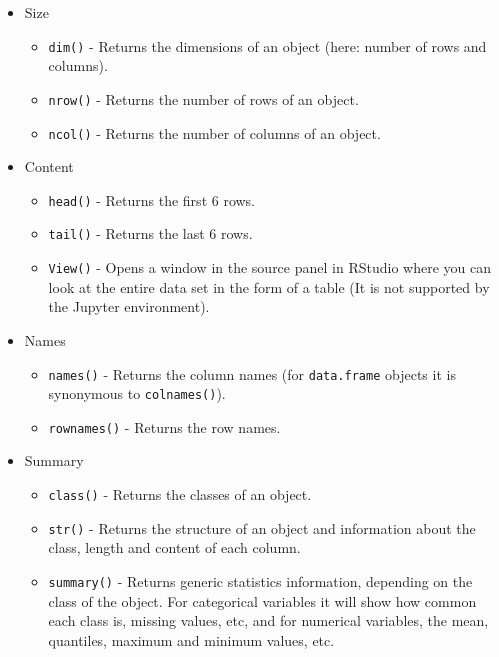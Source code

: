 \documentclass[
]{book}
\providecommand{\tightlist}{%
  \setlength{\itemsep}{0pt}\setlength{\parskip}{0pt}}
\begin{document}
\begin{itemize}
\tightlist
\item
  Size

  \begin{itemize}
  \tightlist
  \item
    \texttt{dim()} - Returns the dimensions of an object (here: number of rows and columns).
  \item
    \texttt{nrow()} - Returns the number of rows of an object.
  \item
    \texttt{ncol()} - Returns the number of columns of an object.
  \end{itemize}
\item
  Content

  \begin{itemize}
  \tightlist
  \item
    \texttt{head()} - Returns the first 6 rows.
  \item
    \texttt{tail()} - Returns the last 6 rows.
  \item
    \texttt{View()} - Opens a window in the source panel in RStudio where you can look at the entire data set in the form of a table (It is not supported by the Jupyter environment).
  \end{itemize}
\item
  Names

  \begin{itemize}
  \tightlist
  \item
    \texttt{names()} - Returns the column names (for \texttt{data.frame} objects it is synonymous to \texttt{colnames()}).
  \item
    \texttt{rownames()} - Returns the row names.
  \end{itemize}
\item
  Summary

  \begin{itemize}
  \tightlist
  \item
    \texttt{class()} - Returns the classes of an object.
  \item
    \texttt{str()} - Returns the structure of an object and information about the class, length and content of each column.
  \item
    \texttt{summary()} - Returns generic statistics information, depending on the class of the object. For categorical variables it will show how common each class is, missing values, etc, and for numerical variables, the mean, quantiles, maximum and minimum values, etc.
  \end{itemize}
\end{itemize}
\end{document}
